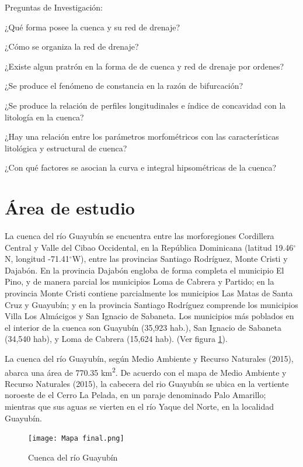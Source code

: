 \documentclass[11pt,]{article}
\begin{document}
Preguntas de Investigación:

¿Qué forma posee la cuenca y su red de drenaje?

¿Cómo se organiza la red de drenaje?

¿Existe algun pratrón en la forma de de cuenca y red de drenaje por
ordenes?

¿Se produce el fenómeno de constancia en la razón de bifurcación?

¿Se produce la relación de perfiles longitudinales e índice de
concavidad con la litología en la cuenca?

¿Hay una relación entre los parámetros morfométricos con las
características litológica y estructural de cuenca?

¿Con qué factores se asocian la curva e integral hipsométricas de la
cuenca?

\section{Área de estudio}\label{uxe1rea-de-estudio}

La cuenca del río Guayubín se encuentra entre las morforegiones
Cordillera Central y Valle del Cibao Occidental, en la República
Dominicana (latitud 19.46\(^\circ\)N, longitud -71.41\(^\circ\)W), entre
las provincias Santiago Rodríguez, Monte Cristi y Dajabón. En la
provincia Dajabón engloba de forma completa el municipio El Pino, y de
manera parcial los municipios Loma de Cabrera y Partido; en la provincia
Monte Cristi contiene parcialmente los municipios Las Matas de Santa
Cruz y Guayubín; y en la provincia Santiago Rodríguez comprende los
municipios Villa Los Almácigos y San Ignacio de Sabaneta. Los municipios
más poblados en el interior de la cuenca son Guayubín (35,923 hab.), San
Ignacio de Sabaneta (34,540 hab), y Loma de Cabrera (15,624 hab). (Ver
figura \ref {mapacuenca}).

La cuenca del río Guayubín, según Medio Ambiente y Recurso Naturales
(2015), abarca una área de 770.35 km\textsuperscript{2}. De acuerdo con
el mapa de Medio Ambiente y Recurso Naturales (2015), la cabecera del
rio Guayubín se ubica en la vertiente noroeste de el Cerro La Pelada, en
un paraje denominado Palo Amarillo; mientras que sus aguas se vierten en
el río Yaque del Norte, en la localidad Guayubín.

\begin{figure}
\centering
\texttt{[image: Mapa final.png]}
\caption{Cuenca del río Guayubín\label{mapacuenca}}
\end{figure}
\end{document}
